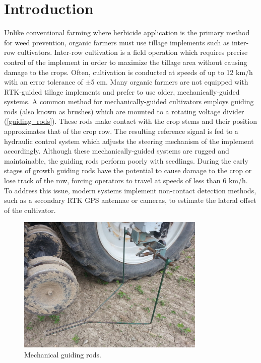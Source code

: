 \documentclass[authoryear]{elsarticle}
\begin{document}
\section{Introduction}
Unlike conventional farming where herbicide application is the primary
method for weed prevention, organic farmers must use tillage
implements such as inter-row cultivators. Inter-row cultivation is a
field operation which requires precise control of the implement in
order to maximize the tillage area without causing damage to the
crops. Often, cultivation is conducted at speeds of up to 12 km/h with
an error tolerance of $\pm$5 cm. Many organic farmers are not equipped
with RTK-guided tillage implements and prefer to use older,
mechanically-guided systems. A common method for mechanically-guided
cultivators employs guiding rods (also known as
brushes) which are mounted to a rotating voltage divider
(\ref{guiding_rods}). These rods make contact with the crop stems and their
position approximates that of the crop row. The resulting reference
signal is fed to a hydraulic control system which adjusts the steering
mechanism of the implement accordingly. Although these
mechanically-guided systems are rugged and maintainable, the guiding
rods perform poorly with seedlings. During the early stages of growth
guiding rods have the potential to cause damage to the crop or lose
track of the row, forcing operators to travel at speeds of less than 6
km/h. To address this issue, modern systems implement non-contact
detection methods, such as a secondary RTK GPS antennae or cameras, to
estimate the lateral offset of the cultivator.

\begin{figure}
  \centering
  \includegraphics[width=0.8\textwidth,natwidth=610,natheight=642]{guiding_rods.jpg}
  \caption{Mechanical guiding rods.}
  \label{fig:guiding_rods}
\end{figure}
\end{document}
